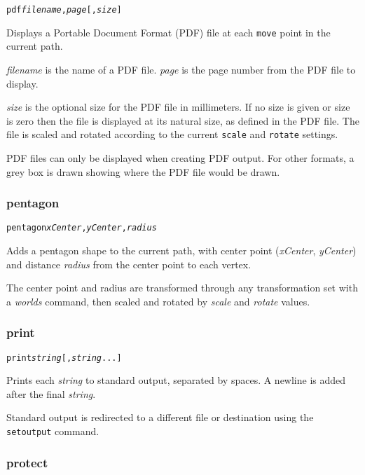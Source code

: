 \begin{alltt}
pdf \textit{filename}, \textit{page} [, \textit{size}]
\end{alltt}

Displays a Portable Document Format (PDF) file at each \texttt{move} point in
the current path.  

\textit{filename} is the name of a PDF file.
\textit{page} is the page number from the PDF file to display.

\textit{size} is the optional size for the PDF file
in millimeters.  If no size
is given or size is zero then the file is displayed at its natural size,
as defined in the PDF file.
The file is scaled and rotated according to the current \texttt{scale}
and \texttt{rotate} settings.

PDF files can only be displayed when creating
PDF output.  For other formats,
a grey box is drawn showing where the PDF file
would be drawn.

\subsubsection{pentagon}

\begin{alltt}
pentagon \textit{xCenter}, \textit{yCenter}, \textit{radius}
\end{alltt}

Adds a pentagon shape to the current path, with center
point (\textit{xCenter}, \textit{yCenter}) and distance
\textit{radius}
from the center point to each vertex.

The center point and radius are transformed through any
transformation set with a \textit{worlds} command,
then scaled and rotated by \textit{scale}
and \textit{rotate} values.

\subsubsection{print}

\begin{alltt}
print \textit{string} [, \textit{string} ...]
\end{alltt}

Prints each \textit{string} to standard output,
separated by spaces.
A newline is added after the final \textit{string}.

Standard output is redirected to a different file
or destination using the \texttt{setoutput} command.

\subsubsection{protect}

